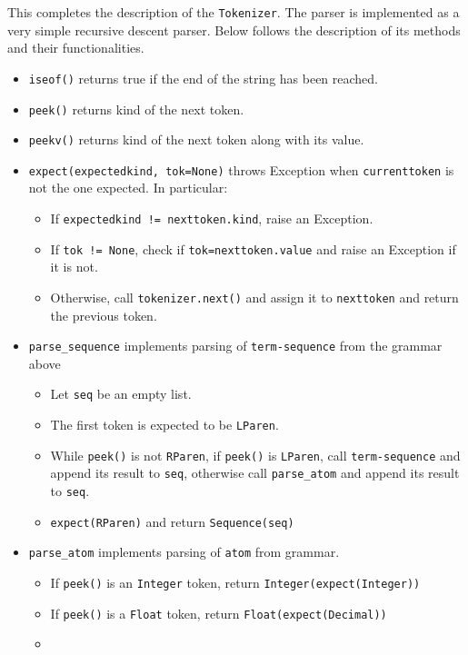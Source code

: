 This completes the description of the \texttt{Tokenizer}. The parser is implemented as a very simple recursive descent parser. Below follows the description of its methods and their functionalities.

\begin{itemize}
\item
\texttt{iseof()} returns true if the end of the string has been reached.

\item
\texttt{peek()} returns kind of the next token. 

\item
\texttt{peekv()} returns kind of the next token along with its value.

\item 
\texttt{expect(expectedkind, tok=None)} throws Exception when \texttt{currenttoken} is not the one expected. In particular:
	\begin{itemize}
		\item
		If \texttt{expectedkind != nexttoken.kind}, raise an Exception.
		\item
		If \texttt{tok != None}, check if \texttt{tok=nexttoken.value} and raise an Exception if it is not.
		\item
		Otherwise, call \texttt{tokenizer.next()} and assign it to \texttt{nexttoken} and return the previous token. 
	\end{itemize}

\item 
	\texttt{parse\_sequence} implements parsing of \texttt{term-sequence} from the grammar above
	\begin{itemize}
		\item
		Let \texttt{seq} be an empty list.

		\item
		The first token is expected to be \texttt{LParen}.

		\item
		While \texttt{peek()} is not \texttt{RParen}, if \texttt{peek()} is \texttt{LParen}, call \texttt{term-sequence} and append its result to \texttt{seq}, otherwise call \texttt{parse\_atom} and append its result to \texttt{seq}.
	
		\item
		\texttt{expect(RParen)} and return \texttt{Sequence(seq)}
	\end{itemize}

\item
\texttt{parse\_atom} implements parsing of \texttt{atom} from grammar.
	\begin{itemize}
	\item
		If \texttt{peek()} is an \texttt{Integer} token, return \texttt{Integer(expect(Integer))}
	\item
		If \texttt{peek()} is a \texttt{Float} token, return \texttt{Float(expect(Decimal))}
	\item


\end{itemize}
\end{itemize}
